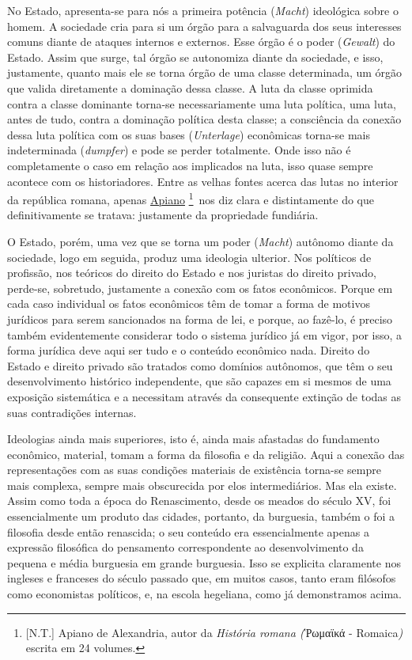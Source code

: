 No Estado, apresenta-se para nós a primeira potência (\emph{Macht})
ideológica sobre o homem. A sociedade cria para si um órgão para a
salvaguarda dos seus interesses comuns diante de ataques internos e
externos. Esse órgão é o poder (\emph{Gewalt}) do Estado. Assim que
surge, tal órgão se autonomiza diante da sociedade, e isso, justamente,
quanto mais ele se torna órgão de uma classe determinada, um órgão que
valida diretamente a dominação dessa classe. A luta da classe oprimida
contra a classe dominante torna-se necessariamente uma luta política,
uma luta, antes de tudo, contra a dominação política desta classe; a
consciência da conexão dessa luta política com os suas bases
(\emph{Unterlage}) econômicas torna-se mais indeterminada
(\emph{dumpfer}) e pode se perder totalmente. Onde isso não é
completamente o caso em relação aos implicados na luta, isso quase
sempre acontece com os historiadores. Entre as velhas fontes acerca das
lutas no interior da república romana,\protect\hypertarget{r36}{}{}
apenas
\href{https://www.marxists.org/portugues/dicionario/verbetes/a/apiano.htm}{Apiano}
\footnote{{[}N.T.{]} Apiano de Alexandria, autor da \emph{História
  romana (}Ῥωμαϊκά - Romaica\emph{)} escrita em 24 volumes.}~nos diz
clara e distintamente do que definitivamente se tratava: justamente da
propriedade fundiária.

O Estado, porém, uma vez que se torna um poder (\emph{Macht}) autônomo
diante da sociedade, logo em seguida, produz uma ideologia ulterior. Nos
políticos de profissão, nos teóricos do direito do Estado e nos juristas
do direito privado, perde-se, sobretudo, justamente a conexão com os
fatos econômicos. Porque em cada caso individual os fatos econômicos têm
de tomar a forma de motivos jurídicos para serem sancionados na forma de
lei, e porque, ao fazê-lo, é preciso também evidentemente considerar
todo o sistema jurídico já em vigor, por isso, a forma jurídica deve
aqui ser tudo e o conteúdo econômico nada. Direito do Estado e direito
privado são tratados como domínios autônomos, que têm o seu
desenvolvimento histórico independente, que são capazes em si mesmos de
uma exposição sistemática e a necessitam através da consequente extinção
de todas as suas contradições internas.

Ideologias ainda mais superiores, isto é, ainda mais afastadas do
fundamento econômico, material, tomam a forma da filosofia e da
religião. Aqui a conexão das representações com as suas condições
materiais de existência torna-se sempre mais complexa, sempre mais
obscurecida por elos intermediários. Mas ela existe. Assim como toda a
época do Renascimento, desde os meados do século XV, foi essencialmente
um produto das cidades, portanto, da burguesia, também o foi a filosofia
desde então renascida; o seu conteúdo era essencialmente apenas a
expressão filosófica do pensamento correspondente ao desenvolvimento da
pequena e média burguesia em grande burguesia. Isso se explicita
claramente nos ingleses e franceses do século passado que, em muitos
casos, tanto eram filósofos como economistas políticos, e, na escola
hegeliana, como já demonstramos acima.

